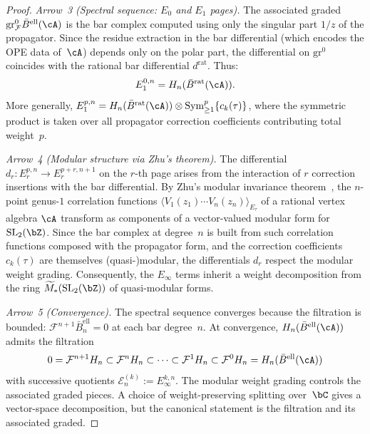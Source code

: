 \begin{proof}
\emph{Arrow~3 (Spectral sequence: $E_0$ and $E_1$ pages).}
The associated graded $\mathrm{gr}^0_{\mathcal{F}}
\bar{B}^{\mathrm{ell}}(\cA)$ is the bar complex computed using only the
singular part $1/z$ of the propagator. Since the residue extraction
in the bar differential (which encodes the OPE data of~$\cA$) depends
only on the polar part, the differential on $\mathrm{gr}^0$ coincides
with the rational bar differential $d^{\mathrm{rat}}$. Thus:
\[
E_1^{0,n} = H_n(\bar{B}^{\mathrm{rat}}(\cA)).
\]
More generally, $E_1^{p,n} = H_n(\bar{B}^{\mathrm{rat}}(\cA)) \otimes
\mathrm{Sym}^p_{\geq 1}\{c_k(\tau)\}$, where the symmetric product is
taken over all propagator correction coefficients contributing total
weight~$p$.

\emph{Arrow~4 (Modular structure via Zhu's theorem).}
The differential $d_r \colon E_r^{p,n} \to E_r^{p+r,n+1}$ on the
$r$-th page arises from the interaction of $r$ correction insertions
with the bar differential. By Zhu's modular invariance
theorem~\cite{Zhu96}, the $n$-point genus-$1$ correlation functions
$\langle V_1(z_1) \cdots V_n(z_n) \rangle_{E_\tau}$ of a rational
vertex algebra $\cA$ transform as components of a vector-valued modular
form for $\mathrm{SL}_2(\bZ)$. Since the bar complex at degree~$n$ is
built from such correlation functions composed with the propagator form,
and the correction coefficients $c_k(\tau)$ are themselves
(quasi-)modular, the differentials $d_r$ respect the modular weight
grading. Consequently, the $E_\infty$ terms inherit a weight
decomposition from the ring $\widetilde{M}_*(\mathrm{SL}_2(\bZ))$
of quasi-modular forms.

\emph{Arrow~5 (Convergence).}
The spectral sequence converges because the filtration is bounded:
$\mathcal{F}^{n+1}\bar{B}^{\mathrm{ell}}_n = 0$ at each bar
degree~$n$. At convergence, $H_n(\bar{B}^{\mathrm{ell}}(\cA))$
admits the filtration
\[
0 = \mathcal{F}^{n+1} H_n \subset \mathcal{F}^n H_n \subset \cdots
\subset \mathcal{F}^1 H_n \subset \mathcal{F}^0 H_n
= H_n(\bar{B}^{\mathrm{ell}}(\cA))
\]
with successive quotients $\mathcal{E}^{(k)}_n := E_\infty^{k,n}$.
The modular weight grading controls the associated graded pieces. A
choice of weight-preserving splitting over~$\bC$ gives a vector-space
decomposition, but the canonical statement is the filtration and its
associated graded.


\end{proof}
